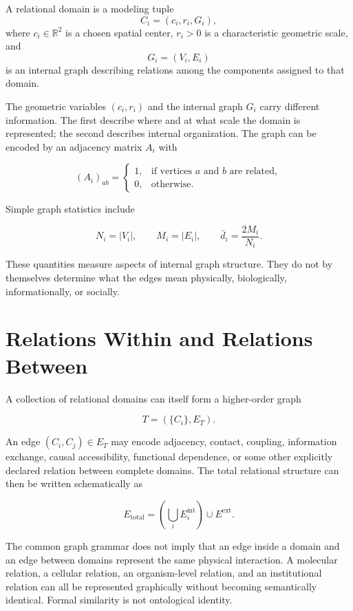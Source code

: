 \begin{definition}
A relational domain is a modeling tuple
\[
C_i=(c_i,r_i,G_i),
\]
where $c_i\in\mathbb R^2$ is a chosen spatial center, $r_i>0$ is a characteristic geometric scale, and
\[
G_i=(V_i,E_i)
\]
is an internal graph describing relations among the components assigned to that domain.
\end{definition}

The geometric variables $(c_i,r_i)$ and the internal graph $G_i$ carry different information. The first describe where and at what scale the domain is represented; the second describes internal organization. The graph can be encoded by an adjacency matrix $A_i$ with

\[
(A_i)_{ab}=
\begin{cases}
1,&\text{if vertices }a\text{ and }b\text{ are related},\\
0,&\text{otherwise}.
\end{cases}
\]

Simple graph statistics include

\[
N_i=|V_i|,
\qquad
M_i=|E_i|,
\qquad
\bar d_i=\frac{2M_i}{N_i}.
\]

These quantities measure aspects of internal graph structure. They do not by themselves determine what the edges mean physically, biologically, informationally, or socially.

\section{Relations Within and Relations Between}

A collection of relational domains can itself form a higher-order graph

\[
T=(\{C_i\},E_T).
\]

An edge $(C_i,C_j)\in E_T$ may encode adjacency, contact, coupling, information exchange, causal accessibility, functional dependence, or some other explicitly declared relation between complete domains. The total relational structure can then be written schematically as

\[
E_{\mathrm{total}}
=
\left(\bigcup_iE_i^{\mathrm{int}}\right)
\cup E^{\mathrm{ext}}.
\]

The common graph grammar does not imply that an edge inside a domain and an edge between domains represent the same physical interaction. A molecular relation, a cellular relation, an organism-level relation, and an institutional relation can all be represented graphically without becoming semantically identical. Formal similarity is not ontological identity.

